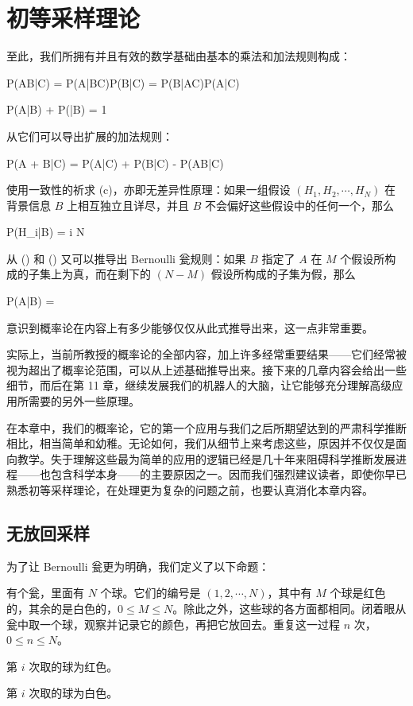 \chapter[quantitative-rules]{初等采样理论}

至此，我们所拥有并且有效的数学基础由基本的乘法和加法规则构成：

\placeformula[3-1]
\startformula
P(AB|C) = P(A|BC)P(B|C) = P(B|AC)P(A|C)
\stopformula

\placeformula[3-2]
\startformula
P(A|B) + P(|B) = 1
\stopformula

从它们可以导出扩展的加法规则：

\placeformula[3-3]
\startformula
P(A + B|C) = P(A|C) + P(B|C) - P(AB|C)
\stopformula

使用一致性的祈求 (c)，亦即无差异性原理：如果一组假设 $(H_1,H_2,\cdots,H_N)$ 在背景信息 $B$ 上相互独立且详尽，并且 $B$ 不会偏好这些假设中的任何一个，那么

\placeformula[3-4]
\startformula
P(H_i|B) = \quad{}\le i \le N
\stopformula

从 (\in[3-3]) 和 (\in[3-4]) 又可以推导出 Bernoulli 瓮规则：如果 $B$ 指定了 $A$ 在 $M$ 个假设所构成的子集上为真，而在剩下的 $(N - M)$ 假设所构成的子集为假，那么

\placeformula[3-5]
\startformula
P(A|B) = 
\stopformula

意识到概率论在内容上有多少能够仅仅从此式推导出来，这一点非常重要。

实际上，当前所教授的概率论的全部内容，加上许多经常重要结果——它们经常被视为超出了概率论范围，可以从上述基础推导出来。接下来的几章内容会给出一些细节，而后在第 11 章，继续发展我们的机器人的大脑，让它能够充分理解高级应用所需要的另外一些原理。

在本章中，我们的概率论，它的第一个应用与我们之后所期望达到的严肃科学推断相比，相当简单和幼稚。无论如何，我们从细节上来考虑这些，原因并不仅仅是面向教学。失于理解这些最为简单的应用的逻辑已经是几十年来阻碍科学推断发展进程——也包含科学本身——的主要原因之一。因而我们强烈建议读者，即使你早已熟悉初等采样理论，在处理更为复杂的问题之前，也要认真消化本章内容。

\section{无放回采样}

为了让 Bernoulli 瓮更为明确，我们定义了以下命题：

 有个瓮，里面有 $N$ 个球。它们的编号是 $(1,2,\cdots,N)$，其中有 $M$ 个球是红色的，其余的是白色的，$0\le M \le N$。除此之外，这些球的各方面都相同。闭着眼从瓮中取一个球，观察并记录它的颜色，再把它放回去。重复这一过程 $n$ 次，$0\le n \le N$。\par
{} 第 $i$ 次取的球为红色。\par
{} 第 $i$ 次取的球为白色。\par

